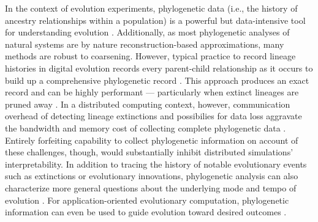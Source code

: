 In the context of evolution experiments, phylogenetic data (i.e., the history of ancestry relationships within a population) is a powerful but data-intensive tool for understanding evolution \citep{faithConservationEvaluationPhylogenetic1992, STAMATAKIS2005phylogenetics,frenchHostPhylogenyShapes2023,kim2006discovery,lewinsohnStatedependentEvolutionaryModels2023a,lenski2003evolutionary}.
Additionally, as most phylogenetic analyses of natural systems are by nature reconstruction-based approximations, many methods are robust to coarsening.
However, typical practice to record lineage histories in digital evolution records every parent-child relationship as it occurs to build up a comprehensive phylogenetic record \citep{moreno2024algorithms}.
This approach produces an exact record and can be highly performant --- particularly when extinct lineages are pruned away \citep{dolson2024phylotrackpy}.
In a distributed computing context, however, communication overhead of detecting lineage extinctions and possibilies for data loss aggravate the bandwidth and memory cost of collecting complete phylogenetic data \citep{moreno2024algorithms}.
Entirely forfeiting capability to collect phylogenetic information on account of these challenges, though, would substantially inhibit distributed simulations' interpretability.
In addition to tracing the history of notable evolutionary events such as extinctions or evolutionary innovations, phylogenetic analysis can also characterize more general questions about the underlying mode and tempo of evolution \citep{moreno2023toward,hernandez2022can,lewinsohnStatedependentEvolutionaryModels2023a}.
For application-oriented evolutionary computation, phylogenetic information can even be used to guide evolution toward desired outcomes \citep{lalejini2024phylogeny,lalejini2024runtime,shahbandegan2022untangling,murphy2008simple,burke2003increased}.


